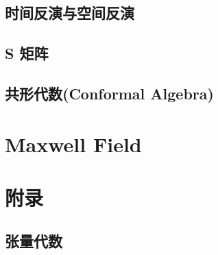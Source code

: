 \documentclass{article}
\begin{document}
\subsection{时间反演与空间反演}




\subsection{S 矩阵}

\subsection{共形代数(Conformal Algebra)}




\section{Maxwell Field}































\section{附录}
\subsection{张量代数}
\end{document}
